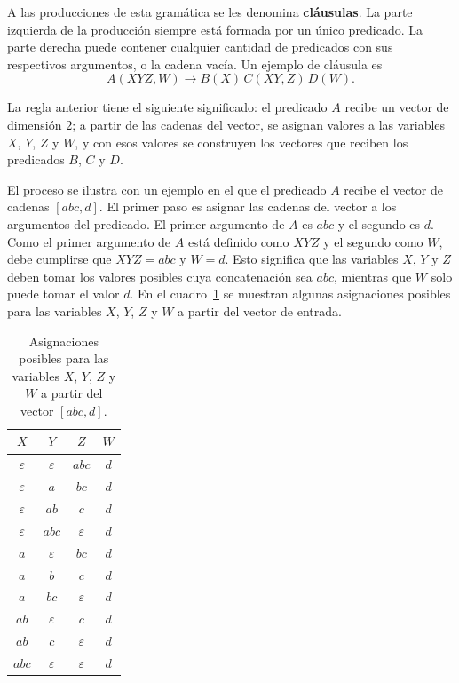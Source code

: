 \documentclass{report}
\theoremstyle{definition}
\theoremstyle{plain}
\theoremstyle{remark}
\begin{document}
A las producciones de esta gramática se les denomina \textbf{cláusulas}.
La parte izquierda de la producción siempre está formada por un único
predicado. La parte derecha puede contener cualquier cantidad de
predicados con sus respectivos argumentos, o la cadena vacía. Un ejemplo
de cláusula es
\[
  A(XYZ, W) \to B(X)\, C(XY, Z)\, D(W).
\]

La regla anterior tiene el siguiente significado: el predicado $A$
recibe un vector de dimensión $2$; a partir de las cadenas del vector,
se asignan valores a las variables $X$, $Y$, $Z$ y $W$, y con esos
valores se construyen los vectores que reciben los predicados $B$, $C$
y $D$.

El proceso se ilustra con un ejemplo en el que el predicado $A$ recibe
el vector de cadenas $[abc, d]$. El primer paso es asignar las cadenas
del vector a los argumentos del predicado. El primer argumento de $A$
es $abc$ y el segundo es $d$. Como el primer argumento de $A$ está
definido como $XYZ$ y el segundo como $W$, debe cumplirse que $XYZ = abc$
y $W = d$. Esto significa que las variables $X$, $Y$ y $Z$ deben tomar
los valores posibles cuya concatenación sea $abc$, mientras que $W$ solo
puede tomar el valor $d$. En el cuadro~\ref{tab:valores-xyzw} se
muestran algunas asignaciones posibles para las variables $X$, $Y$, $Z$
y $W$ a partir del vector de entrada.

\begin{table}[ht]
  \centering
  \begin{tabular}{|c|c|c|c|}
    \hline
    $X$ & $Y$ & $Z$ & $W$ \\ \hline
    $\varepsilon$ & $\varepsilon$ & $abc$ & $d$ \\ \hline
    $\varepsilon$ & $a$ & $bc$ & $d$ \\ \hline
    $\varepsilon$ & $ab$ & $c$ & $d$ \\ \hline
    $\varepsilon$ & $abc$ & $\varepsilon$ & $d$ \\ \hline
    $a$ & $\varepsilon$ & $bc$ & $d$ \\ \hline
    $a$ & $b$ & $c$ & $d$ \\ \hline
    $a$ & $bc$ & $\varepsilon$ & $d$ \\ \hline
    $ab$ & $\varepsilon$ & $c$ & $d$ \\ \hline
    $ab$ & $c$ & $\varepsilon$ & $d$ \\ \hline
    $abc$ & $\varepsilon$ & $\varepsilon$ & $d$ \\ \hline
  \end{tabular}
  \caption{Asignaciones posibles para las variables $X$, $Y$, $Z$ y
  $W$ a partir del vector $[abc, d]$.}
  \label{tab:valores-xyzw}
\end{table}
\end{document}
